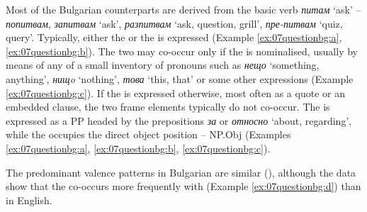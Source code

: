 \documentclass[output=paper,colorlinks,citecolor=brown]{langscibook}
\begin{document}
Most of the Bulgarian counterparts are derived from the basic  verb \textit{питам} `ask' -- \textit{попитвам}, \textit{запитвам} `ask', \textit{разпитвам} `ask, question, grill', \textit{пре-\newline питвам} `quiz, query'. Typically, either the  or the  is expressed (Example \ref{ex:07questionbg:a}, \ref{ex:07questionbg:b}). The two may co-occur only if the  is nominalised, usually by means of any of a small inventory of pronouns such as \textit{нещо} `something, anything', \textit{нищo} `nothing', \textit{това} `this, that' or some other expressions %
(Example \ref{ex:07questionbg:c}). If the  is expressed otherwise, most often as a quote or an embedded clause, the two frame elements typically do not co-occur. The  is expressed as a PP headed by the prepositions \textit{за} or \textit{относно} `about, regarding', while the  occupies the direct object position -- NP.Obj (Examples \ref{ex:07questionbg:a}, \ref{ex:07questionbg:b}, \ref{ex:07questionbg:c}).


The predominant valence patterns in Bulgarian are similar (), although the data show that the  co-occurs more frequently with  (Example \ref{ex:07questionbg:d}) than in English.
\end{document}

